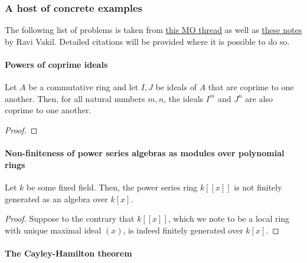 \subsubsection{A host of concrete examples}
    The following list of problems is taken from \href{https://mathoverflow.net/questions/59071/what-elementary-problems-can-you-solve-with-schemes}{\underline{this MO thread}} as well as \href{http://math.stanford.edu/~vakil/725/funprobs.pdf}{\underline{these notes}}  by Ravi Vakil. Detailed citations will be provided where it is possible to do so.
    
    \paragraph{Powers of coprime ideals}
        \begin{proposition}
            Let $A$ be a commutative ring and let $I, J$ be ideals of $A$ that are coprime to one another. Then, for all natural numbers $m, n$, the ideals $I^m$ and $J^n$ are also coprime to one another. 
        \end{proposition}
            \begin{proof}
                
            \end{proof}
            
    \paragraph{Non-finiteness of power series algebras as modules over polynomial rings}
        \begin{proposition}
            Let $k$ be some fixed field. Then, the power series ring $k[[x]]$ is not finitely generated as an algebra over $k[x]$. 
        \end{proposition}
            \begin{proof}
                Suppose to the contrary that $k[[x]]$, which we note to be a local ring with unique maximal ideal $(x)$, is indeed finitely generated over $k[x]$. 
            \end{proof}
    
    \paragraph{The Cayley-Hamilton theorem}
    
